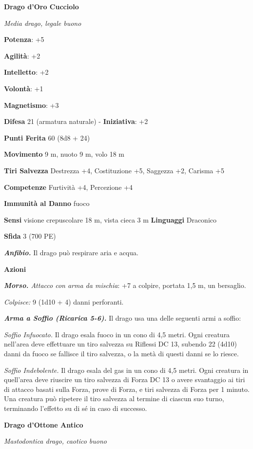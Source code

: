 \begin{multicols}{2}
\textbf{Drago d'Oro Cucciolo}

\emph{Media drago, legale buono}

\textbf{Potenza}: +5

\textbf{Agilità}: +2

\textbf{Intelletto}: +2

\textbf{Volontà}: +1

\textbf{Magnetismo}: +3

\textbf{Difesa} 21 (armatura naturale) - \textbf{Iniziativa}: +2

\textbf{Punti Ferita} 60 (8d8 + 24)

\textbf{Movimento} 9 m, nuoto 9 m, volo 18 m

\textbf{Tiri Salvezza} Destrezza +4, Costituzione +5, Saggezza +2,
Carisma +5

\textbf{Competenze} Furtività +4, Percezione +4

\textbf{Immunità al Danno} fuoco

\textbf{Sensi} visione crepuscolare 18 m, vista cieca 3 m
\textbf{Linguaggi} Draconico

\textbf{Sfida} 3 (700 PE)

\emph{\textbf{Anfibio.}} Il drago può respirare aria e acqua.

\textbf{Azioni}

\emph{\textbf{Morso.} Attacco con arma da mischia}: +7 a colpire,
portata 1,5 m, un bersaglio.

\emph{Colpisce:} 9 (1d10 + 4) danni perforanti.

\emph{\textbf{Arma a Soffio (Ricarica 5-6).}} Il drago usa una delle
seguenti armi a soffio:

\emph{Soffio Infuocato.} Il drago esala fuoco in un cono di 4,5 metri.
Ogni creatura nell'area deve effettuare un tiro salvezza su Riflessi DC
13, subendo 22 (4d10) danni da fuoco se fallisce il tiro salvezza, o la
metà di questi danni se lo riesce.

\emph{Soffio Indebolente.} Il drago esala del gas in un cono di 4,5
metri. Ogni creatura in quell'area deve riuscire un tiro salvezza di Forza DC 13 o avere svantaggio ai tiri di attacco basati sulla Forza,
prove di Forza, e tiri salvezza di Forza per 1 minuto. Una creatura può
ripetere il tiro salvezza al termine di ciascun suo turno, terminando
l'effetto su di sé in caso di successo.



\textbf{Drago d'Ottone Antico}

\emph{Mastodontica drago, caotico buono}


\end{multicols}
